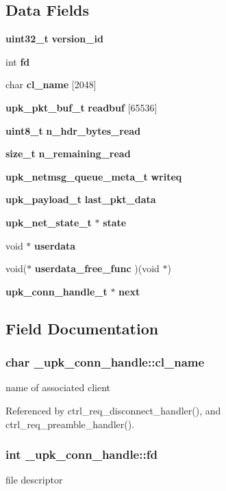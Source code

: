 \subsection*{Data Fields}
\begin{DoxyCompactItemize}
\item 
{\bf uint32\_\-t} {\bf version\_\-id}
\item 
int {\bf fd}
\item 
char {\bf cl\_\-name} [2048]
\item 
{\bf upk\_\-pkt\_\-buf\_\-t} {\bf readbuf} [65536]
\item 
{\bf uint8\_\-t} {\bf n\_\-hdr\_\-bytes\_\-read}
\item 
{\bf size\_\-t} {\bf n\_\-remaining\_\-read}
\item 
{\bf upk\_\-netmsg\_\-queue\_\-meta\_\-t} {\bf writeq}
\item 
{\bf upk\_\-payload\_\-t} {\bf last\_\-pkt\_\-data}
\item 
{\bf upk\_\-net\_\-state\_\-t} $\ast$ {\bf state}
\item 
void $\ast$ {\bf userdata}
\item 
void($\ast$ {\bf userdata\_\-free\_\-func} )(void $\ast$)
\item 
{\bf upk\_\-conn\_\-handle\_\-t} $\ast$ {\bf next}
\end{DoxyCompactItemize}


\subsection{Field Documentation}
\subsubsection[{cl\_\-name}]{\setlength{\rightskip}{0pt plus 5cm}char {\bf \_\-upk\_\-conn\_\-handle::cl\_\-name}}\label{struct__upk__conn__handle_a24a3e21f391126c62c16ab056e901fd6}
name of associated client 

Referenced by ctrl\_\-req\_\-disconnect\_\-handler(), and ctrl\_\-req\_\-preamble\_\-handler().

\subsubsection[{fd}]{\setlength{\rightskip}{0pt plus 5cm}int {\bf \_\-upk\_\-conn\_\-handle::fd}}\label{struct__upk__conn__handle_ac03668d85ace564c00ace2a0dafa5a99}
file descriptor 

